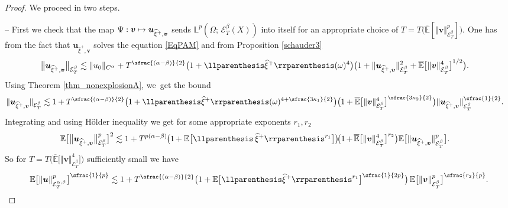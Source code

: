 \documentclass[10pt]{amsart}
\newcommand\mto{\mathchoice{\longmapsto}{\mapsto}{\mapsto}{\mapsto}}
\newcommand{\psfrac}[2]{\sfrac{(#1)}{#2}}
\theoremstyle{definition}
\newcommand\bbE{\mathbb{E}}
\newcommand{\mcE}{\mathcal{E}}
\newcommand{\bbL}{\mathbb{L}}
\newcommand{\bsu}{\boldsymbol{u}}
\newcommand{\bsv}{\boldsymbol{v}}
\newcommand{\dab}{\mcE^\beta_T}
\newcommand{\norme}[1]{\Vert #1 \Vert}
\begin{document}
\begin{proof}
We proceed in two steps.

-- First we check that the map $\Psi : \bsv\mto \bsu_{\widehat\xi^+,\bsv}$ sends $\bbL^p(\Omega;\,\mcE^\beta_T(X))$ into itself for an appropriate choice of $T=T\bigl(\overline{\bbE}[\Vert \bsv\Vert^p_{\mcE^\beta_{{T}}}]\bigr)$. One has from the fact that $\bsu_{\widehat\xi^+,\bsv}$ solves the equation \eqref{EqPAM} and from Proposition \ref{schauder3}
\begin{align*}
\big\Vert \bsu_{\widehat\xi^+,\bsv} \big\Vert_{\mcE^\beta_T} &\lesssim \norme{u_0}_{C^\alpha} + T^{\psfrac{\alpha-\beta}{2}} \bigl(1 + \llparenthesis\widehat\xi^+\rrparenthesis(\omega)^4 \bigr) \bigl(1+ \norme{\bsu_{\widehat\xi^+,\bsv}}^2_{\mcE^\beta_T} + \overline{\bbE}\bigl[ \norme{\bsv}^4_{\mcE^\beta_T}\bigr]^{1/2}\bigr).
\end{align*}
Using Theorem \ref{thm_nonexplosionA}, we~get the bound
\begin{align*}
\norme{\bsu_{\widehat\xi^+,\bsv}}_{\mcE^\beta_T}&\lesssim 1 + T^{\psfrac{\alpha-\beta}{2}} \bigl(1 + \llparenthesis\widehat\xi^+\rrparenthesis(\omega)^{4+\sfrac{3\kappa_1}{2}} \bigr) \bigl(1 + \overline{\bbE}\bigl[ \norme{\bsv}^4_{\mcE^\beta_T}\bigr]^{\sfrac{3\kappa_2}{2}} \bigr) \norme{\bsu_{\widehat\xi^+,\bsv}}^{\sfrac{1}{2}}_{\mcE^\beta_T}.
\end{align*}
Integrating and using Hölder inequality we get for some appropriate exponents $r_1,r_2$
\begin{align*}
\bbE\bigl[ &\big\Vert \bsu_{\widehat\xi^+,\bsv} \big\Vert_{\mcE_T^\beta}^p\bigr]^2 \lesssim 1 + T^{p(\alpha-\beta)} \hspace{-0.03cm} \bigl(1 \hspace{-0.03cm}+ \bbE\bigl[\llparenthesis\,\widehat\xi^+\rrparenthesis^{r_1}\bigr]\bigr) \hspace{-0.03cm} \hspace{-0.03cm} \bigl(1 \hspace{-0.03cm}+\hspace{-0.03cm} \overline{\bbE}\bigl[\norme{\bsv}^{4}_{\dab}\bigr]^{r_2}\bigr) \bbE\bigl[\norme{\bsu_{\widehat\xi^+,\bsv}}_{\mcE_T^{\beta}}^{p}\bigr].
\end{align*}
So for $T = T\bigl(\overline{\bbE}\bigl[\Vert\bsv\Vert_{\dab}^4\bigr]\bigr)$ sufficiently small we have
\[
\bbE\bigl[\norme\bsu_{\mcE_T^{\alpha,\beta}}^{p}\bigr]^{\sfrac{1}{p}} \lesssim 1 + T^{\psfrac{\alpha-\beta}{2}}\bigl(1 + \bbE\bigl[\llparenthesis\widehat\xi^+\rrparenthesis^{r_1}\bigr]^{\sfrac{1}{2p}} \bigr)\, \bbE\bigl[\norme{\bsv}_{\mcE_T^\beta}^{p}\bigr]^{\sfrac{r_2}{p}}.
\]
\end{proof}
\end{document}

